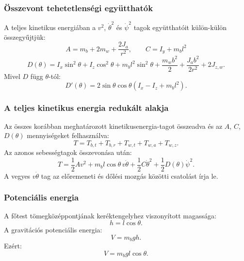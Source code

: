 \documentclass[12pt,a4paper]{report}
\begin{document}
	\subsubsection{Összevont tehetetlenségi együtthatók}
	A teljes kinetikus energiában a \(v^2\), \(\dot\theta^2\) és \(\dot\psi^2\) tagok együtthatóit külön-külön összegyűjtjük:
	\begin{equation}
	\boxed{
		A=m_b+2m_w+\frac{2J_a}{r^2},
		\qquad
		C=I_y+m_bl^2
	}
	\end{equation}
	\begin{equation}
	\boxed{
		D(\theta)=I_x\sin^2\theta+I_z\cos^2\theta+m_bl^2\sin^2\theta
		+\frac{m_wb^2}{2}+\frac{J_ab^2}{2r^2}+2J_{z,w}.
	}
	\end{equation}
	Mivel \(D\) függ \(\theta\)-tól:
	\begin{equation}
	\boxed{
		D'(\theta)=2\sin\theta\cos\theta\left(I_x-I_z+m_bl^2\right).
	}
	\end{equation}
	\subsubsection{A teljes kinetikus energia redukált alakja}
	Az összes korábban meghatározott kinetikusenergia-tagot összeadva és az \(A\), \(C\), \(D(\theta)\) mennyiségeket felhasználva:
	\begin{equation}
	T=T_{b,t}+T_{b,r}+T_{w,t}+T_{w,a}+T_{w,z}.
	\end{equation}
	Az azonos sebességtagok összevonása után:
	\begin{equation}
	\boxed{
		T=
		\frac12Av^2
		+m_bl\cos\theta\,v\dot\theta
		+\frac12C\dot\theta^2
		+\frac12D(\theta)\dot\psi^2.
	}
	\end{equation}
	A vegyes \(v\dot\theta\) tag az előremeneti és dőlési mozgás közötti csatolást írja le.
	
	
	\subsubsection{Potenciális energia}
	A főtest tömegközéppontjának keréktengelyhez viszonyított magassága:
	\begin{equation}
	h=l\cos\theta.
	\end{equation}
	A gravitációs potenciális energia:
	\begin{equation}
	V=m_bgh.
	\end{equation}
	Ezért:
	\begin{equation}
	\boxed{
		V=m_bgl\cos\theta.
	}
	\end{equation}
	
\end{document}
